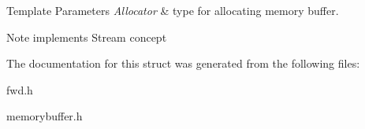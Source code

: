 \begin{DoxyTemplParams}{Template Parameters}
{\em Allocator} & type for allocating memory buffer. \\
\hline
\end{DoxyTemplParams}
\begin{DoxyNote}{Note}
implements Stream concept 
\end{DoxyNote}


The documentation for this struct was generated from the following files\+:\begin{DoxyCompactItemize}
\item 
fwd.\+h\item 
memorybuffer.\+h\end{DoxyCompactItemize}
